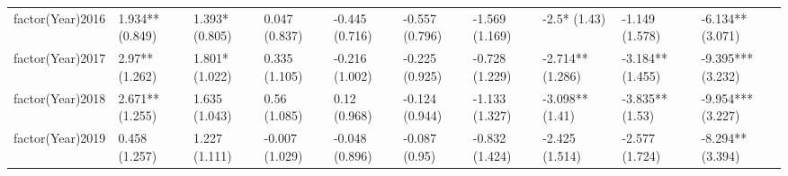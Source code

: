\begin{table}[ht]
\begin{tabular}{llllllllll}
  factor(Year)2016 & 1.934** (0.849) & 1.393* (0.805) & 0.047 (0.837) & -0.445 (0.716) & -0.557 (0.796) & -1.569 (1.169) & -2.5* (1.43) & -1.149 (1.578) & -6.134** (3.071) \\ 
  factor(Year)2017 & 2.97** (1.262) & 1.801* (1.022) & 0.335 (1.105) & -0.216 (1.002) & -0.225 (0.925) & -0.728 (1.229) & -2.714** (1.286) & -3.184** (1.455) & -9.395*** (3.232) \\ 
  factor(Year)2018 & 2.671** (1.255) & 1.635 (1.043) & 0.56 (1.085) & 0.12 (0.968) & -0.124 (0.944) & -1.133 (1.327) & -3.098** (1.41) & -3.835** (1.53) & -9.954*** (3.227) \\ 
  factor(Year)2019 & 0.458 (1.257) & 1.227 (1.111) & -0.007 (1.029) & -0.048 (0.896) & -0.087 (0.95) & -0.832 (1.424) & -2.425 (1.514) & -2.577 (1.724) & -8.294** (3.394) \\ 
   \bottomrule
\end{tabular}
\endgroup
\end{table}
